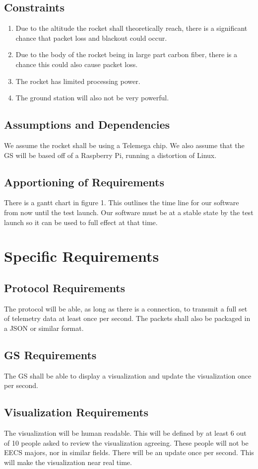 \documentclass[onecolumn, draftclsnofoot,10pt, compsoc]{IEEEtran}
\begin{document}
\subsection{Constraints}
 \begin{enumerate}
    \item Due to the altitude the rocket shall theoretically reach, there is a significant chance that
packet loss and blackout could occur.
    \item Due to the body of the rocket being in large part carbon fiber, there is a chance this could
also cause packet loss.
    \item The rocket has limited processing power.
    \item The ground station will also not be very powerful.
 \end{enumerate}
\subsection{Assumptions and Dependencies}
We assume the rocket shall be using a Telemega chip. We also assume that the GS will be
based off of a Raspberry Pi, running a distortion of Linux.
\subsection{Apportioning of Requirements}
There is a gantt chart in figure 1. This outlines the time line for our software from now until the
test launch. Our software must be at a stable state by the test launch so it can be used to full
effect at that time.
\section{Specific Requirements}
\subsection{Protocol Requirements} The protocol will be able, as long as there is a connection, to
transmit a full set of telemetry data at least once per second. The packets shall also be
packaged in a JSON or similar format.

\subsection{GS Requirements}
The GS shall be able to display a visualization and update the
visualization once per second.
\subsection{Visualization Requirements}
The visualization will be human readable. This will be
defined by at least 6 out of 10 people asked to review the visualization agreeing. These
people will not be EECS majors, nor in similar fields. There will be an update once per
second. This will make the visualization near real time.
\end{document}
